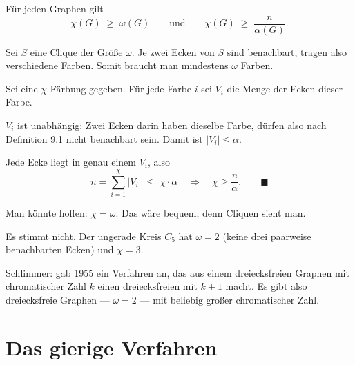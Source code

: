 \begin{merksatz}
Für jeden Graphen gilt
\[ \chi(G) \;\ge\; \omega(G) \qquad \text{und} \qquad \chi(G) \;\ge\; \frac{n}{\alpha(G)} . \]

Sei $S$ eine Clique der Größe $\omega$. Je zwei Ecken von $S$ sind benachbart, tragen also verschiedene Farben. Somit braucht man mindestens $\omega$ Farben.

Sei eine $\chi$-Färbung gegeben. Für jede Farbe $i$ sei $V_i$ die Menge der Ecken dieser Farbe.

$V_i$ ist unabhängig: Zwei Ecken darin haben dieselbe Farbe, dürfen also nach Definition 9.1 nicht benachbart sein. Damit ist $|V_i| \le \alpha$.

Jede Ecke liegt in genau einem $V_i$, also
\[ n = \sum_{i=1}^{\chi} |V_i| \;\le\; \chi \cdot \alpha \quad\Longrightarrow\quad \chi \ge \frac{n}{\alpha} . \qquad \blacksquare \]
\end{merksatz}

\begin{warnung}
Man könnte hoffen: $\chi = \omega$. Das wäre bequem, denn Cliquen sieht man.

Es stimmt nicht. Der ungerade Kreis $C_5$ hat $\omega = 2$ (keine drei paarweise benachbarten Ecken) und $\chi = 3$.

Schlimmer:  gab 1955 ein Verfahren an, das aus einem dreiecksfreien Graphen mit chromatischer Zahl $k$ einen dreiecksfreien mit $k+1$ macht. Es gibt also dreiecksfreie Graphen --- $\omega = 2$ --- mit beliebig großer chromatischer Zahl.

\begin{center}
\begin{minipage}{0.88\textwidth}
\end{minipage}
\end{center}
\end{warnung}

\section{Das gierige Verfahren}

